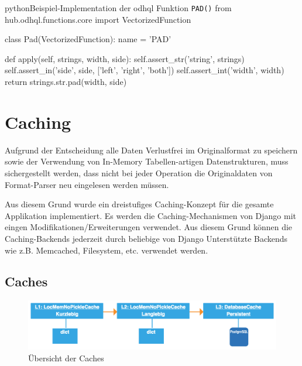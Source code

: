\begin{srclst}[label=src:pd:odhql-function]{python}{Beispiel-Implementation der \acs{odhql} Funktion \texttt{PAD()}}
from hub.odhql.functions.core import VectorizedFunction

class Pad(VectorizedFunction):
    name = 'PAD'

    def apply(self, strings, width, side):
        self.assert_str('string', strings)
        self.assert_in('side', side, ['left', 'right', 'both'])
        self.assert_int('width', width)
        return strings.str.pad(width, side)
\end{srclst}


\section{Caching}
Aufgrund der Entscheidung alle Daten Verlustfrei im Originalformat zu speichern sowie der Verwendung von In-Memory Tabellen-artigen Datenstrukturen, muss sichergestellt werden, dass nicht bei jeder Operation die Originaldaten von Format-Parser neu eingelesen werden müssen.

Aus diesem Grund wurde ein dreistufiges Caching-Konzept für die gesamte Applikation implementiert. Es werden die Caching-Mechanismen von Django mit eingen Modifikationen/Erweiterungen verwendet. Aus diesem Grund können die Caching-Backends jederzeit durch beliebige von Django Unterstützte Backends wie z.B. Memcached, Filesystem, etc. verwendet werden.

\subsection{Caches}

\xxx[ref]
\begin{figure}[H]
\centering
\includegraphics[width=\linewidth]{fig/caching.pdf}
\caption{Übersicht der Caches}
\label{fig:pd:caches}
\end{figure}

